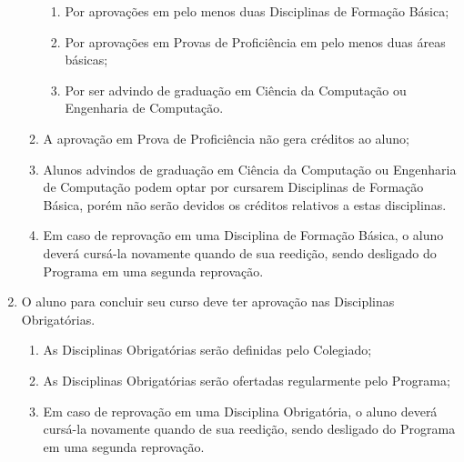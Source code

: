 \documentclass{article}
\begin{document}
\begin{enumerate}
\begin{enumerate}
		\begin{enumerate}[label=\Roman*]
			\item Por aprovações em pelo menos duas Disciplinas de Formação Básica;
			\item Por aprovações em Provas de Proficiência em pelo menos duas áreas básicas; 
			\item Por ser advindo de graduação em Ciência da Computação ou Engenharia de Computação.
		\end{enumerate}

		\item A aprovação em Prova de Proficiência não gera créditos ao aluno;

		\item Alunos advindos de graduação em Ciência da Computação ou Engenharia de Computação podem optar por cursarem Disciplinas de Formação Básica, porém não serão devidos os créditos relativos a estas disciplinas.

		\item Em caso de reprovação em uma Disciplina de Formação Básica, o aluno deverá cursá-la novamente quando de sua reedição, sendo desligado do Programa em uma segunda reprovação.
	\end{enumerate}

	\item O aluno para concluir seu curso deve ter aprovação nas Disciplinas Obrigatórias.
	\begin{enumerate}
		\item As Disciplinas Obrigatórias serão definidas pelo Colegiado;
		\item As Disciplinas Obrigatórias serão ofertadas regularmente pelo Programa;
		\item Em caso de reprovação em uma Disciplina Obrigatória, o aluno deverá cursá-la novamente quando de sua reedição, sendo desligado do Programa em uma segunda reprovação.
	\end{enumerate}
\end{enumerate}
\end{document}
